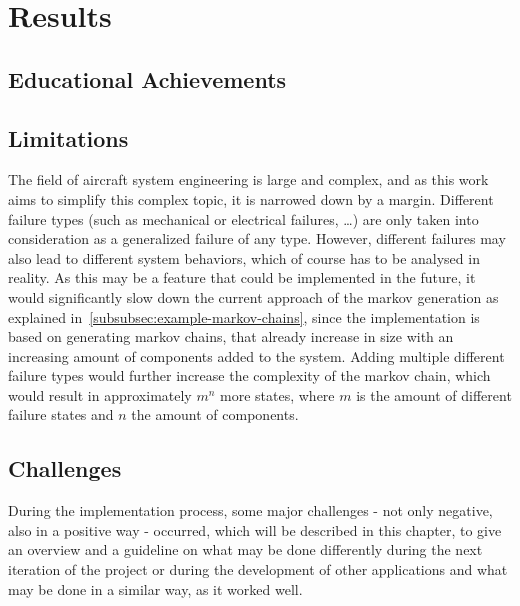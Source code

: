 \chapter{Results}\label{ch:results}
\section{Educational Achievements}\label{sec:educational-achievements}
\section{Limitations}\label{sec:limitations}
The field of aircraft system engineering is large and complex, and as this work aims to simplify this complex topic,
it is narrowed down by a margin.
Different failure types (such as mechanical or electrical failures, \ldots) are only taken into consideration as a
generalized failure of any type.
However, different failures may also lead to different system behaviors, which of course has to be analysed in reality.
As this may be a feature that could be implemented in the future, it would significantly slow down the current approach of
the markov generation as explained in~\ref{subsubsec:example-markov-chains}, since the implementation is based
on generating markov chains, that already increase in size with an increasing amount of components added to the system.
Adding multiple different failure types would further increase the complexity of the markov chain, which would result in
approximately $m^n$ more states, where $m$ is the amount of different failure states and $n$ the amount of components.

\section{Challenges}\label{sec:challenges}
During the implementation process, some major challenges - not only negative, also in a positive way - occurred, which will be described in this chapter, to give an
overview and a guideline on what may be done differently during the next iteration of the project or during the development of other
applications and what may be done in a similar way, as it worked well.
